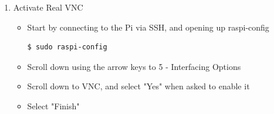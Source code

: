 \begin{enumerate}
    \item Activate Real VNC\\
        \begin{itemize}
            \item Start by connecting to the Pi via SSH, and opening up raspi-config
        \begin{lstlisting}[gobble=8]
        $ sudo raspi-config
        \end{lstlisting}
        \item Scroll down using the arrow keys to 5 - Interfacing Options
        \item Scroll down to VNC, and select "Yes" when asked to enable it
        \item Select "Finish"
    \end{itemize}
    

\end{enumerate}

